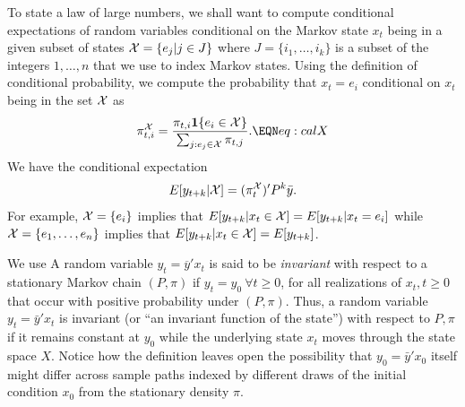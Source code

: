To state a law of large numbers, we shall want to compute conditional expectations of random variables conditional on the Markov 
state $x_t$ being in a given subset of states ${\cal X} = \{ e_{j} | j \in J \}$ where $ J= \{ i_1, \ldots , i_k\} $ is a subset
of the integers $1, \ldots, n$ that we use to index  Markov states.  Using the definition of conditional probability, we compute 
the probability that $x_t = e_i$ conditional on $x_t$ being in the set $\cal X$ as
$$ \pi_{t,i}^{\cal X} = {\frac{\pi_{t,i} {\bf 1}\{e_i \in {\cal X} \}}{\sum_{j: e_j \in {\cal X}} \pi_{t,j}}} . \EQN eq:calX $$
We have the conditional expectation
$$ E [ y_{t+k} | {\cal X}] = (\pi_t^{\cal X})'P^k \bar y .  $$
For example,  
${\cal X} = \{e_i\}$ implies that $ E [ y_{t+k} | x_t  \in {\cal X}] = E [y_{t+k} | x_t = e_i]$ while
${\cal X} = \{e_1, \ldots, e_n\}$ implies that $ E [ y_{t+k} | x_t \in  {\cal X}] = E [y_{t+k}] $.


\medskip


\noindent We use
\medskip
{} A random variable $y_t = \overline y' x_t $ is said to
be  {\it invariant\/} with respect to a stationary Markov chain $(P, \pi)$ if
$y_t = y_0 \ \forall t \geq 0$,
 for all realizations of  $x_t, t \geq 0$ that occur with positive probability under $(P, \pi)$.
\enddefinition
\medskip
\noindent  Thus, a random variable $y_t = \bar y' x_t $ is invariant (or ``an invariant function
of the state'') with respect to $P, \pi$ if it remains constant
at $y_0$ while the underlying state $x_t$ moves through the state space $X$.  Notice how
the definition leaves open the possibility that $y_0 = \bar y' x_0$ itself might differ across sample paths indexed by
different draws of the initial condition
$x_0$ from the stationary density $\pi$.

%
%
%
%


